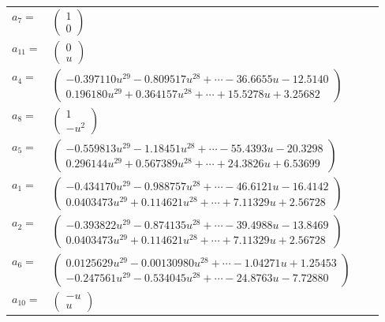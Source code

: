 \documentclass[1p]{elsarticle_modified}
\theoremstyle{definition}
\begin{document}
\begin{tabular}{m{7pt} m{180pt} m{7pt} m{180pt} }
\flushright $a_{7}=$&$\begin{pmatrix}1\\0\end{pmatrix}$ \\
\flushright $a_{11}=$&$\begin{pmatrix}0\\u\end{pmatrix}$ \\
\flushright $a_{4}=$&$\begin{pmatrix}-0.397110 u^{29}-0.809517 u^{28}+\cdots-36.6655 u-12.5140\\0.196180 u^{29}+0.364157 u^{28}+\cdots+15.5278 u+3.25682\end{pmatrix}$ \\
\flushright $a_{8}=$&$\begin{pmatrix}1\\- u^2\end{pmatrix}$ \\
\flushright $a_{5}=$&$\begin{pmatrix}-0.559813 u^{29}-1.18451 u^{28}+\cdots-55.4393 u-20.3298\\0.296144 u^{29}+0.567389 u^{28}+\cdots+24.3826 u+6.53699\end{pmatrix}$ \\
\flushright $a_{1}=$&$\begin{pmatrix}-0.434170 u^{29}-0.988757 u^{28}+\cdots-46.6121 u-16.4142\\0.0403473 u^{29}+0.114621 u^{28}+\cdots+7.11329 u+2.56728\end{pmatrix}$ \\
\flushright $a_{2}=$&$\begin{pmatrix}-0.393822 u^{29}-0.874135 u^{28}+\cdots-39.4988 u-13.8469\\0.0403473 u^{29}+0.114621 u^{28}+\cdots+7.11329 u+2.56728\end{pmatrix}$ \\
\flushright $a_{6}=$&$\begin{pmatrix}0.0125629 u^{29}-0.00130980 u^{28}+\cdots-1.04271 u+1.25453\\-0.247561 u^{29}-0.534045 u^{28}+\cdots-24.8763 u-7.72880\end{pmatrix}$ \\
\flushright $a_{10}=$&$\begin{pmatrix}- u\\u\end{pmatrix}$ \\

\end{tabular}
\end{document}
